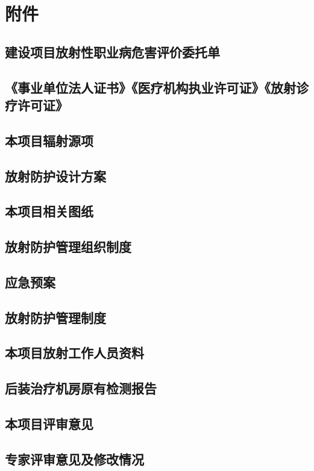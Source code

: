 \clearpage


\renewcommand{\thechapter}{}
\setcounter{chapter}{0}
\renewcommand{\thesection}{附件\arabic{section}}
\setcounter{section}{0}

\chapter*{附件}

\section{建设项目放射性职业病危害评价委托单}

\section{《事业单位法人证书》《医疗机构执业许可证》《放射诊疗许可证》}

\section{本项目辐射源项}

\section{放射防护设计方案}

\section{本项目相关图纸}

\section{放射防护管理组织制度}

\section{应急预案}

\section{放射防护管理制度}

\section{本项目放射工作人员资料}

\section{后装治疗机房原有检测报告}

\section{本项目评审意见}

\section{专家评审意见及修改情况}
